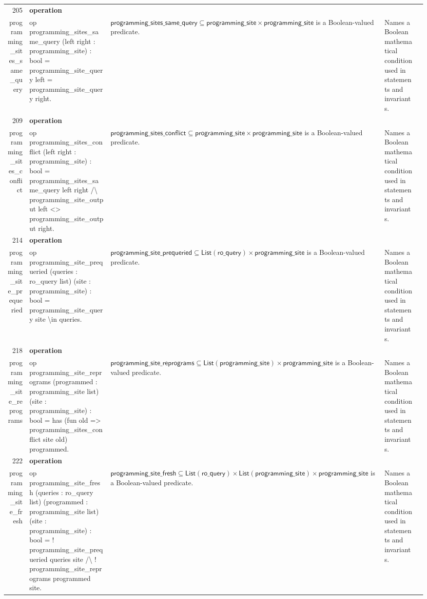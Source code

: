 \documentclass[10pt]{article}
\newcommand{\ec}[1]{\begingroup\ttfamily\scriptsize #1\endgroup}
\begin{document}
\begin{longtable}{r L{0.17\textwidth} L{0.26\textwidth} L{0.27\textwidth} L{0.20\textwidth}}
205 & \textbf{operation}\\\ec{programming\_sites\_same\_query} & \ec{op programming\_sites\_same\_query (left right : programming\_site) : bool = programming\_site\_query left = programming\_site\_query right.} & \(\mathsf{programming\_sites\_same\_query} \subseteq \mathsf{programming\_site} \times \mathsf{programming\_site}\) is a Boolean-valued predicate. & Names a Boolean mathematical condition used in statements and invariants. \\
209 & \textbf{operation}\\\ec{programming\_sites\_conflict} & \ec{op programming\_sites\_conflict (left right : programming\_site) : bool = programming\_sites\_same\_query left right /\textbackslash{} programming\_site\_output left <> programming\_site\_output right.} & \(\mathsf{programming\_sites\_conflict} \subseteq \mathsf{programming\_site} \times \mathsf{programming\_site}\) is a Boolean-valued predicate. & Names a Boolean mathematical condition used in statements and invariants. \\
214 & \textbf{operation}\\\ec{programming\_site\_prequeried} & \ec{op programming\_site\_prequeried (queries : ro\_query list) (site : programming\_site) : bool = programming\_site\_query site \textbackslash{}in queries.} & \(\mathsf{programming\_site\_prequeried} \subseteq \mathsf{List}(\mathsf{ro\_query}) \times \mathsf{programming\_site}\) is a Boolean-valued predicate. & Names a Boolean mathematical condition used in statements and invariants. \\
218 & \textbf{operation}\\\ec{programming\_site\_reprograms} & \ec{op programming\_site\_reprograms (programmed : programming\_site list) (site : programming\_site) : bool = has (fun old => programming\_sites\_conflict site old) programmed.} & \(\mathsf{programming\_site\_reprograms} \subseteq \mathsf{List}(\mathsf{programming\_site}) \times \mathsf{programming\_site}\) is a Boolean-valued predicate. & Names a Boolean mathematical condition used in statements and invariants. \\
222 & \textbf{operation}\\\ec{programming\_site\_fresh} & \ec{op programming\_site\_fresh (queries : ro\_query list) (programmed : programming\_site list) (site : programming\_site) : bool = ! programming\_site\_prequeried queries site /\textbackslash{} ! programming\_site\_reprograms programmed site.} & \(\mathsf{programming\_site\_fresh} \subseteq \mathsf{List}(\mathsf{ro\_query}) \times \mathsf{List}(\mathsf{programming\_site}) \times \mathsf{programming\_site}\) is a Boolean-valued predicate. & Names a Boolean mathematical condition used in statements and invariants. \\

\end{longtable}
\end{document}
